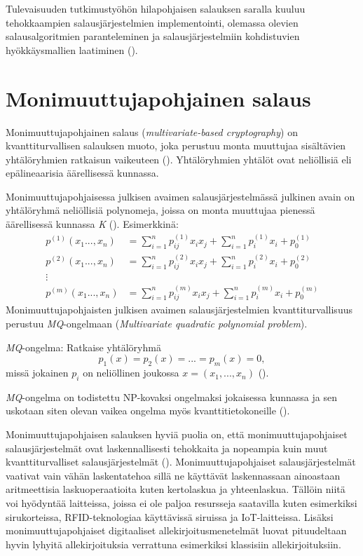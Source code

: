 Tulevaisuuden tutkimustyöhön hilapohjaisen salauksen saralla kuuluu tehokkaampien salausjärjestelmien implementointi, olemassa olevien salausalgoritmien paranteleminen ja salausjärjestelmiin kohdistuvien hyökkäysmallien laatiminen (\cite{8275352}).

\section{Monimuuttujapohjainen salaus}
Monimuuttujapohjainen salaus (\emph{multivariate-based cryptography}) on kvanttiturvallisen salauksen muoto, joka perustuu monta muuttujaa sisältävien yhtälöryhmien ratkaisun vaikeuteen (\cite{Ding2009}). Yhtälöryhmien yhtälöt ovat neliöllisiä eli epälineaarisia äärellisessä kunnassa.

Monimuuttujapohjaisessa julkisen avaimen salausjärjestelmässä julkinen avain on yhtälöryhmä neliöllisiä polynomeja, joissa on monta muuttujaa pienessä äärellisessä kunnassa \emph{K} (\cite{8012305}). Esimerkkinä: 
    \begin{align*}
        p^{(1)}(x_{1}...,x_{n}) &= \sum_{i=1}^{n} p_{ij}^{(1)}x_{i}x_ {j}+\sum_{i=1}^{n}p_ {i}^{(1)}x_{i}+p_ {0}^{(1)} \\
        p^{(2)}(x_{1}...,x_{n}) &= \sum_{i=1}^{n} p_{ij}^{(2)}x_{i}x_ {j}+\sum_{i=1}^{n}p_ {i}^{(2)}x_{i}+p_ {0}^{(2)} \\
        \vdots \\
        p^{(m)}(x_{1}...,x_{n}) &= \sum_{i=1}^{n} p_{ij}^{(m)}x_{i}x_ {j}+\sum_{i=1}^{n}p_ {i}^{(m)}x_{i}+p_ {0}^{(m)}
    \end{align*}
Monimuuttujapohjaisten julkisen avaimen salausjärjestelmien kvanttiturvallisuus perustuu \emph{MQ}-ongelmaan (\emph{Multivariate quadratic polynomial problem}).

\emph{MQ}-ongelma: Ratkaise yhtälöryhmä \[p_{1}(x) = p_{2}(x) = ... = p_ {m}(x) = 0,\] missä jokainen $p_{i}$ on neliöllinen joukossa $x = (x_{1}, ..., x_{n})$ (\cite{Ding2009}).

\emph{MQ}-ongelma on todistettu NP-kovaksi ongelmaksi jokaisessa kunnassa ja sen uskotaan siten olevan vaikea ongelma myös kvanttitietokoneille (\cite{8012305}).

Monimuuttujapohjaisen salauksen hyviä puolia on, että monimuuttujapohjaiset salausjärjestelmät ovat laskennallisesti tehokkaita ja nopeampia kuin muut kvanttiturvalliset salausjärjestelmät  (\cite{8012305}). Monimuuttujapohjaiset salausjärjestelmät vaativat vain vähän laskentatehoa sillä ne käyttävät laskennassaan ainoastaan aritmeettisia laskuoperaatioita kuten kertolaskua ja yhteenlaskua. Tällöin niitä voi hyödyntää laitteissa, joissa ei ole paljoa resursseja saatavilla kuten esimerkiksi sirukorteissa, RFID-teknologiaa käyttävissä siruissa ja IoT-laitteissa. Lisäksi monimuuttujapohjaiset digitaaliset allekirjoitusmenetelmät luovat pituudeltaan hyvin lyhyitä allekirjoituksia verrattuna esimerkiksi klassisiin allekirjoituksiin.

